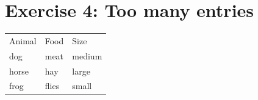 \documentclass{article}
\begin{document}
\section*{Exercise 4: Too many entries}

\begin{tabular}{lll}
Animal & Food & Size \\
dog & meat & medium  \\
horse & hay & large \\
frog & flies & small \\
\end{tabular}
\end{document}

